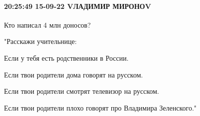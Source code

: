  
 
 
 
 

\paragraph{20:25:49 15-09-22 VЛАДИМИР МИРОНОV}

Кто написал 4 млн доносов?🤔


"Расскажи учительнице:


Если у тебя есть родственники в России.


Если твои родители дома говорят на русском.


Если твои родители смотрят телевизор на русском.


Если твои родители плохо говорят про Владимира Зеленского."
